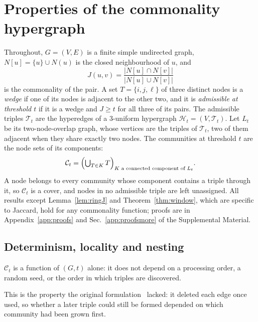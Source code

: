\section{Properties of the commonality hypergraph}
\label{sec:theory}

Throughout, $G=(V,E)$ is a finite simple undirected graph, $N[u]=\{u\}\cup N(u)$ is
the closed neighbourhood of $u$, and
\begin{equation}
  J(u,v)=\frac{|N[u]\cap N[v]|}{|N[u]\cup N[v]|}
  \label{eq:jaccard}
\end{equation}
is the commonality of the pair. A set $T=\{i,j,\ell\}$ of three distinct nodes is a
\emph{wedge} if one of its nodes is adjacent to the other two, and it is
\emph{admissible at threshold $t$} if it is a wedge and $J\ge t$ for all three of its
pairs. The admissible triples $\mathcal T_t$ are the hyperedges of a 3-uniform
hypergraph $\mathcal H_t=(V,\mathcal T_t)$. Let $L_t$ be its two-node-overlap graph,
whose vertices are the triples of $\mathcal T_t$, two of them adjacent when they share
exactly two nodes. The communities at threshold $t$ are the node sets of its
components:
\begin{equation}
  \mathcal C_t=\Bigl(\textstyle\bigcup_{T\in K}T\Bigr)_{K \text{ a connected component of } L_t}.
  \label{eq:communities}
\end{equation}
A node belongs to every community whose component contains a triple through it, so
$\mathcal C_t$ is a cover, and nodes in no admissible triple are left unassigned. All
results except Lemma~\ref{lem:ringJ} and Theorem~\ref{thm:window}, which are specific to
Jaccard, hold for any commonality function; proofs are in Appendix~\ref{app:proofs} and Sec.~\ref{app:proofsmore} of the Supplemental Material.

\subsection{Determinism, locality and nesting}

\begin{proposition}
\label{prop:determinism}
$\mathcal C_t$ is a function of $(G,t)$ alone: it does not depend on a processing
order, a random seed, or the order in which triples are discovered.
\end{proposition}
This is the property the original formulation~\cite{deinega2023thesis} lacked: it
deleted each edge once used, so whether a later triple could still be formed depended on
which community had been grown first.

